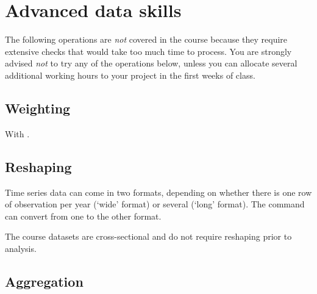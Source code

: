%
%
\section{Advanced data skills}

The following operations are \emph{not} covered in the course because they require extensive checks that would take too much time to process. You are strongly advised \emph{not} to try any of the operations below, unless you can allocate several additional working hours to your project in the first weeks of class.

%
\subsection{Weighting}

With .

%
\subsection{Reshaping}

Time series data can come in two formats, depending on whether there is one row of observation per year (`wide' format) or several (`long' format). The  command can convert from one to the other format.
    
The course datasets are cross-sectional and do not require reshaping prior to analysis.

%
\subsection{Aggregation}

